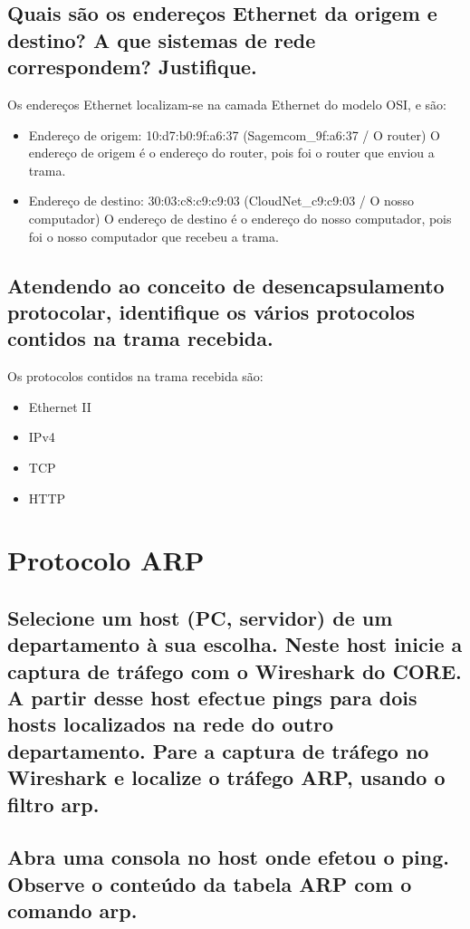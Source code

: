 \documentclass{article}
\begin{document}
\subsection{Quais são os endereços Ethernet da origem e destino? A que sistemas de rede
correspondem? Justifique.}

Os endereços Ethernet localizam-se na camada Ethernet do modelo OSI, e são:
\begin{itemize}
    \item Endereço de origem: 10:d7:b0:9f:a6:37 (Sagemcom\_9f:a6:37 / O router) \linebreak
    O endereço de origem é o endereço do router, pois foi o router que enviou a trama.
    \item Endereço de destino: 30:03:c8:c9:c9:03 (CloudNet\_c9:c9:03 / O nosso computador) \linebreak
    O endereço de destino é o endereço do nosso computador, pois foi o nosso computador que recebeu a trama.
\end{itemize}

\subsection{Atendendo ao conceito de desencapsulamento protocolar, identifique os vários
protocolos contidos na trama recebida.}

Os protocolos contidos na trama recebida são:
\begin{itemize}
    \item Ethernet II
    \item IPv4
    \item TCP
    \item HTTP
\end{itemize}

\section{Protocolo ARP}
\subsection*{Selecione um host (PC, servidor) de um departamento à sua escolha. Neste host inicie a
captura de tráfego com o Wireshark do CORE. A partir desse host efectue pings para dois
hosts localizados na rede do outro departamento. Pare a captura de tráfego no
Wireshark e localize o tráfego ARP, usando o filtro arp.}

\subsection{Abra uma consola no host onde efetou o ping. Observe o conteúdo da tabela ARP
com o comando arp.}
\end{document}
